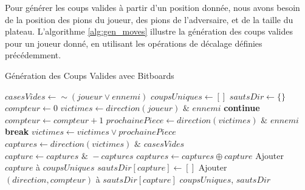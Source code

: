 Pour générer les coups valides à partir d'un position donnée, nous avons besoin de la position des pions du joueur, des pions de l'adversaire, et de la taille du plateau. L'algorithme \ref{alg:gen_moves} illustre la génération des coups valides pour un joueur donné, en utilisant les opérations de décalage définies précédemment.
\begin{algorithm}[H]
    \caption{Génération des Coups Valides avec Bitboards}
    \begin{algorithmic}[1]
        \State $casesVides \gets \sim(joueur \lor ennemi)$
        \State $coupsUniques \gets []$
        \State $sautsDir \gets \{\}$
            \State $compteur \gets 0$
            \State $victimes \gets direction(joueur) \,\, \& \,\, ennemi$
                \State \textbf{continue}
            \EndIf
                \State $compteur \gets compteur + 1$
                \State $prochainePiece \gets direction(victimes) \,\, \& \,\, ennemi$
                    \State \textbf{break}
                \EndIf
                \State $victimes \gets victimes \lor prochainePiece$
            \EndFor
            \State $captures \gets direction(victimes) \,\, \& \,\, casesVides$
                \State $capture \gets captures \,\, \& \,\, -captures$
                \State $captures \gets captures \oplus capture$
                    \State Ajouter $capture$ à $coupsUniques$
                    \State $sautsDir[capture] \gets []$
                \EndIf
                \State Ajouter $(direction, compteur)$ à $sautsDir[capture]$
            \EndWhile
        \EndFor
        \State \Return $coupsUniques$, $sautsDir$
    \EndFunction
    \end{algorithmic}
    \label{alg:gen_moves}
\end{algorithm}


